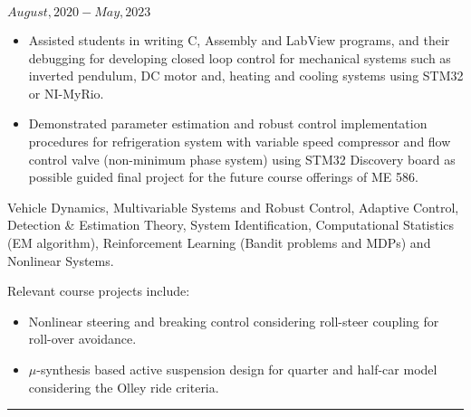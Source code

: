 \noindent {} \hfill $August, 2020 - May, 2023$
\begin{itemize}

        \item Assisted students in writing C, Assembly and LabView programs, and their debugging for developing closed loop control for mechanical systems such as inverted pendulum, DC motor and, heating and cooling systems using STM32 or NI-MyRio.

        \item {} Demonstrated parameter estimation and robust control implementation procedures for refrigeration system with variable speed compressor and flow control valve (non-minimum phase system) using STM32 Discovery board as possible guided final project for the future course offerings of ME 586.
\end{itemize}
\medskip
 Vehicle Dynamics, Multivariable Systems and Robust Control, Adaptive Control, Detection \& Estimation Theory, System Identification, Computational Statistics (EM algorithm), Reinforcement Learning (Bandit problems and MDPs) and Nonlinear Systems.

Relevant course projects include:
\begin{itemize}
        \item Nonlinear steering and breaking control considering roll-steer coupling for roll-over avoidance.
        \item $\mu$-synthesis based active suspension design for quarter and half-car model considering the Olley ride criteria.
\end{itemize}

\noindent\rule{\textwidth}{0.4pt}
